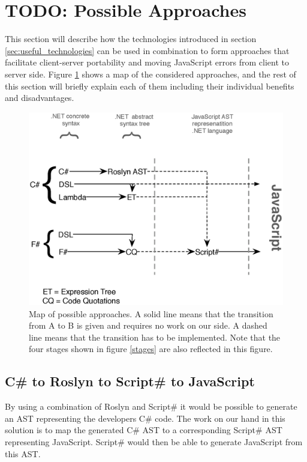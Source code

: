 \section{TODO: Possible Approaches} %
\label{sec:possible_approaches}
	This section will describe how the technologies introduced in section \ref{sec:useful_technologies} can be used in combination to form approaches that facilitate client-server portability and moving JavaScript errors from client to server side. Figure \ref{approachMap} shows a map of the considered approaches, and the rest of this section will briefly explain each of them including their individual benefits and disadvantages. 

	\begin{figure}[H]
		\begin{center}
			\centerline{\includegraphics[width=14cm]{resources/images/approachComparison.eps}}
		\end{center}
		\caption{Map of possible approaches. A solid line means that the transition from A to B is given and requires no work on our side. A dashed line means that the transition has to be implemented. Note that the four stages shown in figure \ref{stages} are also reflected in this figure.}
		\label{approachMap}
	\end{figure}

		
	\subsection{C\# to Roslyn to Script\# to JavaScript} %
	\label{ssub:c_to_roslyn_to_script_to_javascript}
		By using a combination of Roslyn and Script\# it would be possible to generate an AST representing the developers C\# code. The work on our hand in this solution is to map the generated C\# AST to a corresponding Script\# AST representing JavaScript. Script\# would then be able to generate JavaScript from this AST.

